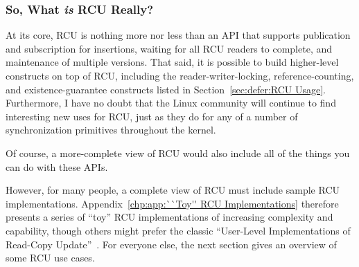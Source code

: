 \subsubsection{So, What \emph{is} RCU Really?}
\label{sec:defer:So, What is RCU Really?}

At its core, RCU is nothing more nor less than an API that supports
publication and subscription for insertions, waiting for all RCU readers
to complete, and maintenance of multiple versions.
That said, it is possible to build higher-level constructs
on top of RCU, including the reader-writer-locking, reference-counting,
and existence-guarantee constructs listed in
Section~\ref{sec:defer:RCU Usage}.
Furthermore, I have no doubt that the Linux community will continue to
find interesting new uses for RCU,
just as they do for any of a number of synchronization
primitives throughout the kernel.

Of course, a more-complete view of RCU would also include
all of the things you can do with these APIs.

However, for many people, a complete view of RCU must include sample
RCU implementations.
Appendix~\ref{chp:app:``Toy'' RCU Implementations} therefore presents a series
of ``toy'' RCU implementations of increasing complexity and capability,
though others might prefer the classic
``User-Level Implementations of Read-Copy
Update''~\cite{MathieuDesnoyers2012URCU}.
For everyone else, the next section gives an overview of some RCU use cases.
